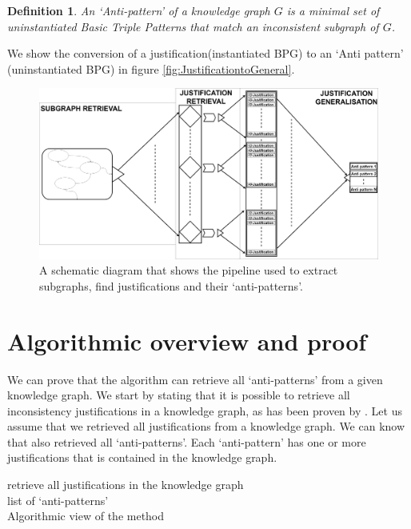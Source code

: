 \documentclass[11pt,letterpaper ,oneside ]{book}
\newtheorem{definition}{Definition}
\begin{document}
	\begin{definition} 
		An \textit{`Anti-pattern'} of a knowledge graph $G$ is a minimal set of uninstantiated Basic Triple Patterns that match an inconsistent subgraph of $G$.
	\end{definition}
	
	We show the conversion of a justification(instantiated BPG) to an `Anti pattern' (uninstantiated BPG) in figure \ref{fig:JustificationtoGeneral}.
	
	
	\begin{figure}
		\includegraphics[width=\linewidth]{images/SimplifiedPipelineMissingPart.png}
		\caption{A schematic diagram that shows the pipeline used to extract subgraphs, find justifications and their `anti-patterns'.}
		\label{fig:simplePipeline}
	\end{figure}
	
	\section{Algorithmic overview and proof}
	We can prove that the algorithm can retrieve all `anti-patterns' from a given knowledge graph. We start by stating that it is possible to retrieve all inconsistency justifications in a knowledge graph, as has been proven by \cite{Horridge:2009}. Let us assume that we retrieved all justifications from a knowledge graph. We can know that also retrieved all `anti-patterns'. Each `anti-pattern' has one or more justifications that is contained in the knowledge graph. \\
	
	\begin{algorithm}
		
		retrieve all justifications in the knowledge graph\\
		\Return list of `anti-patterns'\\
		\caption{Algorithmic view of the method}
	\end{algorithm}
	
\end{document}
